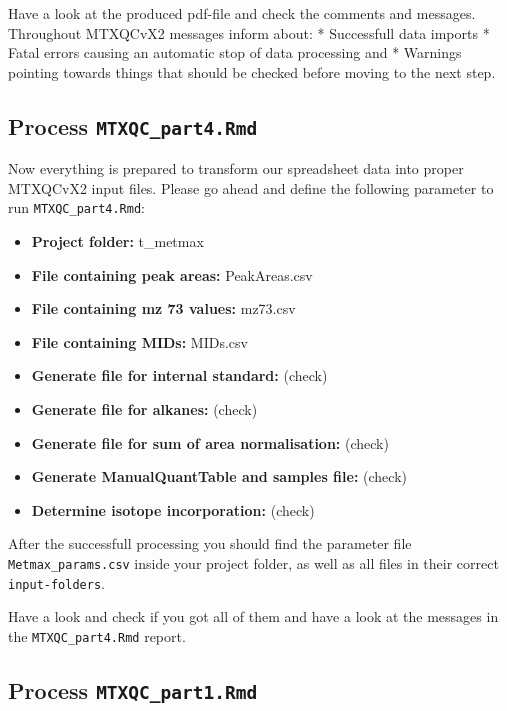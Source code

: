 \documentclass[]{book}
\providecommand{\tightlist}{%
  \setlength{\itemsep}{0pt}\setlength{\parskip}{0pt}}
\begin{document}
Have a look at the produced pdf-file and check the comments and messages. Throughout MTXQCvX2 messages inform about:
* Successfull data imports
* Fatal errors causing an automatic stop of data processing and
* Warnings pointing towards things that should be checked before moving to the next step.

\hypertarget{process-mtxqc_part4.rmd}{%
\subsection{\texorpdfstring{Process \texttt{MTXQC\_part4.Rmd}}{Process MTXQC\_part4.Rmd}}\label{process-mtxqc_part4.rmd}}

Now everything is prepared to transform our spreadsheet data into proper MTXQCvX2 input files. Please go ahead and define the following parameter to run \texttt{MTXQC\_part4.Rmd}:

\begin{itemize}
\tightlist
\item
  \textbf{Project folder:} t\_metmax
\item
  \textbf{File containing peak areas:} PeakAreas.csv
\item
  \textbf{File containing mz 73 values:} mz73.csv
\item
  \textbf{File containing MIDs:} MIDs.csv
\item
  \textbf{Generate file for internal standard:} (check)
\item
  \textbf{Generate file for alkanes:} (check)
\item
  \textbf{Generate file for sum of area normalisation:} (check)
\item
  \textbf{Generate ManualQuantTable and samples file:} (check)
\item
  \textbf{Determine isotope incorporation:} (check)
\end{itemize}

After the successfull processing you should find the parameter file \texttt{Metmax\_params.csv} inside your project folder, as well as all files in their correct \texttt{input-folders}.

Have a look and check if you got all of them and have a look at the messages in the \texttt{MTXQC\_part4.Rmd} report.

\hypertarget{process-mtxqc_part1.rmd-1}{%
\subsection{\texorpdfstring{Process \texttt{MTXQC\_part1.Rmd}}{Process MTXQC\_part1.Rmd}}\label{process-mtxqc_part1.rmd-1}}
\end{document}
